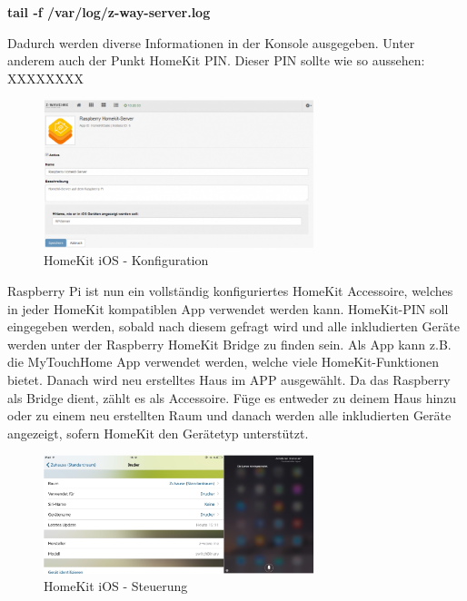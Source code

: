 \textbf{tail -f /var/log/z-way-server.log}

Dadurch werden diverse Informationen in der Konsole ausgegeben. Unter anderem auch der Punkt \glqq HomeKit PIN\grqq. Dieser PIN sollte wie so aussehen: XXXXXXXX

\begin{figure}[h!]
	\centering
	\includegraphics[width=0.7\textwidth]{img/Feedback-Mechanismen/HomeKitKonfiguration.png}
	\caption{HomeKit iOS - Konfiguration}
	\label{fig:feedbackHomeKitKonfiguration}
\end{figure}

Raspberry Pi ist nun ein vollständig konfiguriertes HomeKit Accessoire, welches in jeder HomeKit kompatiblen App verwendet werden kann. HomeKit-PIN soll eingegeben werden, sobald nach diesem gefragt wird und alle inkludierten Geräte werden unter der Raspberry HomeKit Bridge zu finden sein. Als App kann z.B. die \glqq MyTouchHome\grqq{} App verwendet werden, welche viele HomeKit-Funktionen bietet. Danach wird neu erstelltes Haus im APP ausgewählt. Da das Raspberry als Bridge dient, zählt es als Accessoire. Füge es entweder zu deinem Haus hinzu oder zu einem neu erstellten Raum und danach werden alle inkludierten Geräte angezeigt, sofern HomeKit den Gerätetyp unterstützt.

\newpage

\begin{figure}[h!]
	\centering
	\includegraphics[width=0.7\textwidth]{img/Feedback-Mechanismen/HomeKitSteuerung.png}
	\caption{HomeKit iOS - Steuerung}
	\label{fig:feedbackHomeKitSteuerung}
\end{figure}

